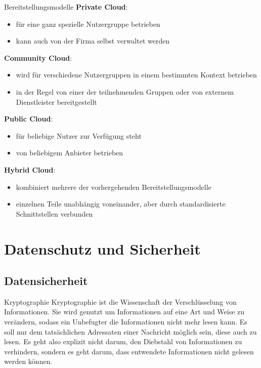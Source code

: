 \documentclass[german]{../spicker}
\begin{document}
\begin{defi}{Bereitstellungsmodelle}
    \textbf{Private Cloud}:
    \begin{itemize}
        \item für eine ganz spezielle Nutzergruppe betrieben
        \item kann auch von der Firma selbst verwaltet werden
    \end{itemize}

    \textbf{Community Cloud}:
    \begin{itemize}
        \item wird für verschiedene Nutzergruppen in einem bestimmten Kontext betrieben
        \item in der Regel von einer der teilnehmenden Gruppen oder von externem Dienstleister bereitgestellt
    \end{itemize}

    \textbf{Public Cloud}:
    \begin{itemize}
        \item für beliebige Nutzer zur Verfügung steht
        \item von beliebigem Anbieter betrieben
    \end{itemize}

    \textbf{Hybrid Cloud}:
    \begin{itemize}
        \item kombiniert mehrere der vorhergehenden Bereitstellungsmodelle
        \item einzelnen Teile unabhängig voneinander, aber durch standardisierte Schnittstellen verbunden
    \end{itemize}
\end{defi}

\section{Datenschutz und Sicherheit}
\subsection{Datensicherheit}

\begin{defi}{Kryptographie}
    Kryptographie ist die Wissenschaft der Verschlüsselung von Informationen. Sie wird genutzt
    um Informationen auf eine Art und Weise zu verändern, sodass ein Unbefugter
    die Informationen nicht mehr lesen kann. Es soll nur dem tatsächlichen Adressaten
    einer Nachricht möglich sein, diese auch zu lesen. Es geht also explizit nicht darum,
    den Diebstahl von Informationen zu verhindern, sondern es geht darum, dass
    entwendete Informationen nicht gelesen werden können.
\end{defi}
\end{document}
